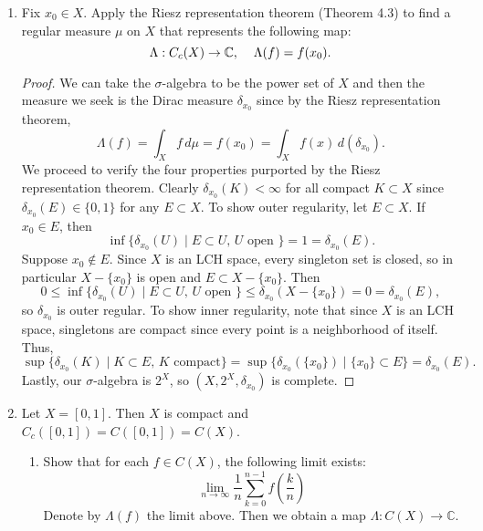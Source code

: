 \documentclass[11pt,oneside,english]{amsart}
\theoremstyle{definition}
\newcommand{\lom}[2]{\lim_{{#1}\rightarrow{#2}}}
\newcommand{\MB}[1]{\mathbb{#1}}
\begin{document}
\rightline{\today}



\vspace{5mm}
\begin{enumerate}
\itemsep7mm



\item Fix $x_0\in X$. Apply the Riesz representation theorem (Theorem 4.3) to find a regular measure $\mu$ on $X$ that represents the following map:
\[
\Lambda:C_c(X)\to \MB{C},\hspace{4mm}\Lambda(f)=f(x_0).
\]

\begin{proof}
We can take the $\sigma$-algebra to be the power set of $X$ and then the measure we seek is the Dirac measure $\delta_{x_0}$ since by the Riesz representation theorem,
\[
\Lambda(f)=\int_Xf\,d\mu=f(x_0)=\int_Xf(x)\,d(\delta_{x_0}).
\]
We proceed to verify the four properties purported by the Riesz representation theorem. Clearly $\delta_{x_0}(K)<\infty$ for all compact $K\subset X$ since $\delta_{x_0}(E)\in\{0,1\}$ for any $E\subset X$. To show outer regularity, let $E\subset X$. If $x_0\in E$, then
\[
\inf\{\delta_{x_0}(U)\mid E\subset U,\, U\text{ open }\}=1=\delta_{x_0}(E).
\]
Suppose $x_0\notin E$. Since $X$ is an LCH space, every singleton set is closed, so in particular $X-\{x_0\}$ is open and $E\subset X-\{x_0\}$. Then
\[
0\leq\inf\{\delta_{x_0}(U)\mid E\subset U,\, U\text{ open }\}\leq\delta_{x_0}(X-\{x_0\})=0=\delta_{x_0}(E),
\]
so $\delta_{x_0}$ is outer regular. To show inner regularity, note that since $X$ is an LCH space, singletons are compact since every point is a neighborhood of itself. Thus,
\[
\sup\{\delta_{x_0}(K)\mid K\subset E,\,K\text{ compact}\}=\sup\{\delta_{x_0}(\{x_0\})\mid\{x_0\}\subset E\}=\delta_{x_0}(E).
\]
Lastly, our $\sigma$-algebra is $2^X$, so $(X,2^X,\delta_{x_0})$ is complete. 
\end{proof}


\item Let $X=[0,1]$. Then $X$ is compact and $C_c([0,1])=C([0,1])=C(X)$.
\begin{enumerate}
\item Show that for each $f\in C(X)$, the following limit exists:
\[
\lom{n}{\infty}\frac{1}{n}\sum_{k=0}^{n-1}f\left(\frac{k}{n}\right)
\]
Denote by $\Lambda(f)$ the limit above. Then we obtain a map $\Lambda:C(X)\to\MB{C}$.


\end{enumerate}
\end{enumerate}
\end{document}
